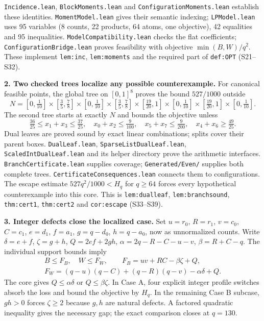 \documentclass[11pt,a4paper]{article}
\newcommand{\file}[1]{\mbox{\small\nolinkurl{#1}}}
\newcommand{\paperref}[1]{{\small\texttt{#1}}}
\begin{document}
\file{Incidence.lean}, \file{BlockMoments.lean} and
\file{ConfigurationMoments.lean} establish these identities.
\file{MomentModel.lean} gives their semantic indexing;
\file{LPModel.lean} uses 95 variables (8 counts, 22 products, 64 atoms, one
objective), 42 equalities and 95 inequalities.
\file{ModelCompatibility.lean} checks the flat coefficients;
\file{ConfigurationBridge.lean} proves feasibility with objective
$\min(B,W)/q^2$. These implement \paperref{lem:inc}, \paperref{lem:moments}
and the required part of \paperref{def:OPT} (S21--S32).

\textbf{2. Two checked trees localize any possible counterexample.}
For canonical feasible points, the global tree on $[0,1]^8$ proves the bound
$527/1000$ outside
\[
 N=[0,\tfrac1{10}]\times[\tfrac35,\tfrac78]\times[0,\tfrac1{10}]
 \times[\tfrac35,\tfrac78]\times[\tfrac{19}{20},1]
\times[0,\tfrac1{10}]\times[\tfrac{19}{20},1]\times[0,\tfrac1{10}].
\]
The second tree starts at exactly $N$ and bounds the objective unless
\[
 \tfrac{36}{25}\le x_1+x_3\le\tfrac{37}{25},\quad
 x_0+x_2\le\tfrac9{100},\quad x_5+x_7\le\tfrac9{200},\quad
 x_4+x_6\ge\tfrac{49}{25}.
\]
Dual leaves are proved sound by exact linear combinations; splits cover
their parent boxes. \file{DualLeaf.lean}, \file{SparseListDualLeaf.lean},
\file{ScaledIntDualLeaf.lean} and its helper directory prove the arithmetic
interfaces. \file{BranchCertificate.lean} supplies coverage;
\file{Generated/Even/} supplies both complete trees.
\file{CertificateConsequences.lean} connects them to configurations.
The escape estimate $527q^2/1000<H_q$ for $q\ge64$ forces every hypothetical
counterexample into this core.
This is \paperref{lem:dualleaf}, \paperref{lem:branchsound},
\paperref{thm:cert1}, \paperref{thm:cert2} and \paperref{cor:escape}
(S33--S39).

\textbf{3. Integer defects close the localized case.}
Set $u=r_0$, $R=r_1$, $v=c_0$, $C=c_1$, $e=d_1$, $f=a_1$,
$g=q-d_0$, $h=q-a_0$, now as unnormalized counts.
Write $\delta=e+f$, $\zeta=g+h$, $Q=2ef+2gh$,
$\alpha=2q-R-C-u-v$, $\beta=R+C-q$.
The individual support bounds imply
\[
 \begin{gathered}
 B\le F_B,\quad W\le F_W,\qquad F_B=uv+RC-\beta\zeta+Q,\\
 F_W=(q-u)(q-C)+(q-R)(q-v)-\alpha\delta+Q.
 \end{gathered}
\]
The core gives $Q\le\alpha\delta$ or $Q\le\beta\zeta$.
In Case A, four explicit integer profile switches absorb the loss and bound
the objective by $H_q$. In the remaining Case B subcase, $gh>0$ forces
$\zeta\ge2$ because $g,h$ are natural defects. A factored quadratic inequality
gives the necessary gap; the exact comparison closes at $q=130$.
\end{document}
